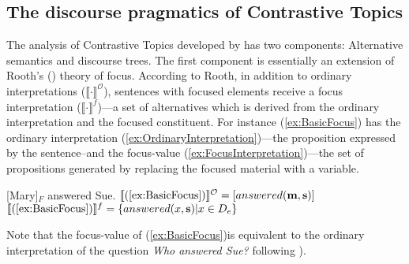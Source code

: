 \documentclass[
	letterpaper,
]{article}
\begin{document}
\subsection{The discourse pragmatics of Contrastive Topics \parencite{buring2003d,buring2016topic}}\label{sec:BuringCT}
The analysis of Contrastive Topics developed by \textcite{buring2003d} has two components: Alternative semantics and discourse trees.
The first component is essentially an extension of Rooth's (\citeyear{rooth1992theory}) theory of focus.
According to Rooth, in addition to ordinary interpretations ($\llbracket\cdot\rrbracket^\mathcal{O}$), sentences with focused elements receive a focus interpretation ($\llbracket\cdot\rrbracket^f$)---a set of alternatives which is derived from the ordinary interpretation and the focused constituent.
For instance (\ref{ex:BasicFocus}) has the ordinary interpretation (\ref{ex:OrdinaryInterpretation})---the proposition expressed by the sentence--and the focus-value (\ref{ex:FocusInterpretation})---the set of propositions generated by replacing the focused material with a variable.
\begin{exe}
	\ex\label{ex:BasicFocus}{[Mary]$_F$ answered Sue.}
	\ex\label{ex:OrdinaryInterpretation} $\llbracket(\ref{ex:BasicFocus})\rrbracket^\mathcal{O} = [answered(\mathbf{m}, \mathbf{s})]$
	\ex\label{ex:FocusInterpretation} $\llbracket(\ref{ex:BasicFocus})\rrbracket^f = \left\{ answered(x, \mathbf{s}) | x \in D_e \right\}$
\end{exe}
Note that the focus-value of (\ref{ex:BasicFocus})is equivalent to the ordinary interpretation of the question \textit{Who answered Sue?} following \textcite{hamblin1973questions}).
\end{document}
